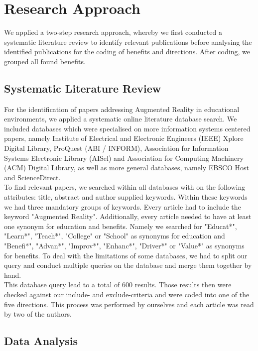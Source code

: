 \section{Research Approach}
We applied a two-step research approach, whereby we first conducted a systematic literature review to identify relevant publications before analysing the identified publications for the coding of benefits and directions. After coding, we grouped all found benefits.

\subsection{Systematic Literature Review}
For the identification of papers addressing Augmented Reality in educational environments, we applied a systematic online literature database search. We included databases which were specialised on more information systems centered papers, namely Institute of Electrical and Electronic Engineers (IEEE) Xplore Digital Library, ProQuest (ABI / INFORM), Association for Information Systems Electronic Library (AISel) and Association for Computing Machinery (ACM) Digital Library, as well as more general databases, namely EBSCO Host and ScienceDirect.\\
To find relevant papers, we searched within all databases with on the following attributes: title, abstract and author supplied keywords. Within these keywords we had three mandatory groups of keywords. Every article had to include the keyword "Augmented Reality". Additionally, every article needed to have at least one synonym for education and benefits. Namely we searched for "Educat*", "Learn*", "Teach*", "College" or "School" as synonyms for education and "Benefi*", "Advan*", "Improv*", "Enhanc*", "Driver*" or "Value*" as synonyms for benefits. To deal with the limitations of some databases, we had to split our query and conduct multiple queries on the database and merge them together by hand.\\
This database query lead to a total of 600 results. Those results then were checked against our include- and exclude-criteria and were coded into one of the five directions. This process was performed by ourselves and each article was read by two of the authors.

\subsection{Data Analysis}